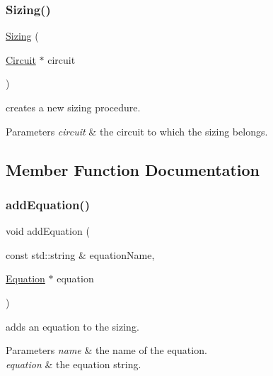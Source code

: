 \subsubsection{\texorpdfstring{Sizing()}{Sizing()}}
{\footnotesize\ttfamily \hyperlink{class_open_chams_1_1_sizing}{Sizing} (\begin{DoxyParamCaption}\item[{\hyperlink{class_open_chams_1_1_circuit}{Circuit} $\ast$}]{circuit }\end{DoxyParamCaption})}



creates a new sizing procedure. 


\begin{DoxyParams}{Parameters}
{\em circuit} & the circuit to which the sizing belongs. \\
\hline
\end{DoxyParams}


\subsection{Member Function Documentation}
\mbox{\label{class_open_chams_1_1_sizing_a01f8823628bb567d1c463c8bef314ca7}} 
\subsubsection{\texorpdfstring{add\+Equation()}{addEquation()}}
{\footnotesize\ttfamily void add\+Equation (\begin{DoxyParamCaption}\item[{const std\+::string \&}]{equation\+Name,  }\item[{\hyperlink{class_open_chams_1_1_equation}{Equation} $\ast$}]{equation }\end{DoxyParamCaption})}



adds an equation to the sizing. 


\begin{DoxyParams}{Parameters}
{\em name} & the name of the equation. \\
\hline
{\em equation} & the equation string. \\
\hline
\end{DoxyParams}
\mbox{\label{class_open_chams_1_1_sizing_a712e045c11e463cff8411b3d0fd7f732}} 
